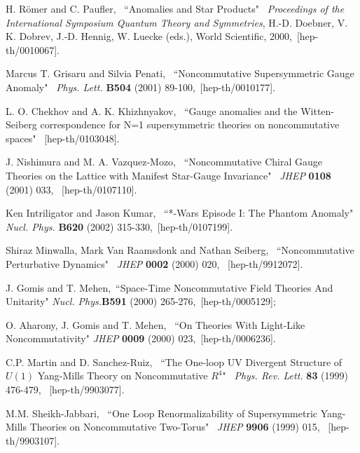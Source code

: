 \documentclass[a4paper,12pt]{article}
\begin{document}
\begin{thebibliography}{References}
H. R\"omer and C. Paufler, \, ``Anomalies and Star Products" \,  
{\it Proceedings of the International Symposium Quantum Theory and Symmetries}, H.-D. Doebner, V. K. Dobrev, J.-D. Hennig, W. Luecke (eds.), 
World Scientific, 2000, \,[hep-th/0010067]. 

Marcus T. Grisaru and Silvia Penati, \, ``Noncommutative Supersymmetric Gauge 
Anomaly" \, {\it Phys. Lett.} {\bf B504} (2001) 89-100, \,[hep-th/0010177]. 

L. O. Chekhov and A. K. Khizhnyakov, \, ``Gauge anomalies and the 
Witten-Seiberg correspondence for N=1 supersymmetric theories on 
noncommutative spaces" \, [hep-th/0103048].

J. Nishimura and M. A. Vazquez-Mozo, \, ``Noncommutative Chiral Gauge Theories 
on the Lattice with Manifest Star-Gauge Invariance" \, {\it JHEP} {\bf 0108} 
(2001) 033, \, [hep-th/0107110]. 

Ken Intriligator and Jason Kumar, \, ``*-Wars Episode I: The Phantom Anomaly" 
\, {\it Nucl. Phys.} {\bf B620} (2002) 315-330, \,[hep-th/0107199]. 

Shiraz Minwalla, Mark Van Raamsdonk and Nathan Seiberg,
\, ``Noncommutative Perturbative Dynamics" \, 
{\it JHEP} {\bf 0002} (2000) 020, \, [hep-th/9912072]. 


%
J. Gomis and T. Mehen, \,``Space-Time Noncommutative Field Theories And 
Unitarity" {\it Nucl. Phys.}{\bf B591} (2000) 265-276, \,[hep-th/0005129]; 

O. Aharony, J. Gomis and T. Mehen, \, ``On Theories With Light-Like 
Noncommutativity" {\it JHEP} {\bf 0009} (2000) 023, \,[hep-th/0006236]. 


C.P. Martin and D. Sanchez-Ruiz, 
\, ``The One-loop UV Divergent Structure of $U(1)$ Yang-Mills Theory on 
Noncommutative $R^{4}$" \, {\it Phys. Rev. Lett.} {\bf 83} (1999) 476-479, 
\, [hep-th/9903077]. 

M.M. Sheikh-Jabbari, \, ``One Loop Renormalizability of Supersymmetric 
Yang-Mills Theories on Noncommutative Two-Torus" \, {\it JHEP} {\bf 9906} 
(1999) 015, \, [hep-th/9903107].


\end{thebibliography}
\end{document}
